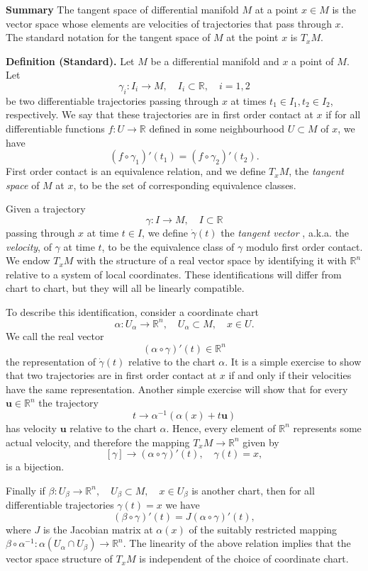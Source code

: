 \documentclass{article}
\newcommand{\reals}{\mathbb{R}}
\newcommand{\dgamma}{\dot{\gamma}}
\newcommand{\bu}{\mathbf{u}}
\begin{document}
{\bf Summary} The tangent space of differential manifold $M$ at a
point $x\in M$ is the vector space whose elements are velocities of
trajectories that pass through $x$. The standard notation for the
tangent space of $M$ at the point $x$ is $T_x M$. 


{\bf Definition (Standard).}  Let $M$ be a differential manifold and
$x$ a point of $M$. Let
$$\gamma_i:I_i\rightarrow M,\quad I_i\subset\reals,\quad i=1,2$$
be
two differentiable trajectories passing through $x$ at times $t_1\in
I_1, t_2\in I_2$, respectively.  We say that these trajectories are in
first order contact at $x$ if for all differentiable functions
$f:U\rightarrow\reals$ defined in some neighbourhood $U\subset M$ of
$x$, we have
$$(f\circ\gamma_1)'(t_1) = (f\circ\gamma_2)'(t_2).$$
First order
contact is an equivalence relation, and we define $T_x M$, the {\em
  tangent space} of $M$ at $x$, to be the set of corresponding
equivalence classes.  

Given a trajectory
$$\gamma:I\rightarrow M,\quad I\subset\reals$$
passing through $x$ at
time $t\in I$, we define $\dgamma(t)$ the {\em tangent vector} ,
a.k.a. the {\em velocity}, of $\gamma$ at time $t$, to be the
equivalence class of $\gamma$ modulo first order contact.  We endow
$T_x M$ with the structure of a real vector space by identifying it
with $\reals^n$ relative to a system of local coordinates.   These
identifications will differ from chart to chart, but they will all be
linearly compatible.

To describe this identification, consider a coordinate chart 
$$\alpha: U_\alpha\to \reals^n,\quad U_\alpha\subset M,\quad x\in U.$$
We call the real vector
$$(\alpha\circ\gamma)'(t)\in\reals^n$$
the representation of
$\dgamma(t)$ relative to the chart $\alpha$.  It is a simple exercise
to show that two trajectories are in first order contact at $x$ if and
only if their velocities have the same representation.  Another simple
exercise will show that for every $\bu\in \reals^n$ the trajectory
$$t\to\alpha^{-1}(\alpha(x) + t\bu)$$
has velocity $\bu$ relative to the chart $\alpha$.  Hence, every
element of $\reals^n$ represents some actual velocity, and therefore
the mapping  $T_x M\to \reals^n$ given by
$$[\gamma]\to (\alpha\circ\gamma)'(t),\quad \gamma(t)=x,$$
is a bijection.

Finally if $\beta:U_\beta\to \reals^n,\quad U_\beta\subset M,\quad
x\in U_\beta$ is another chart, then for all differentiable
trajectories $\gamma(t)=x$ we have
$$(\beta\circ\gamma)'(t) = J (\alpha\circ\gamma)'(t),$$
where $J$ is
the Jacobian matrix at $\alpha(x)$ of the suitably restricted mapping
$\beta\circ\alpha^{-1}:\alpha(U_\alpha\cap U_\beta)\to\reals^n$.  The
linearity of the above relation
implies that the vector space structure of $T_xM$ is independent of the
choice of coordinate chart.
\end{document}
